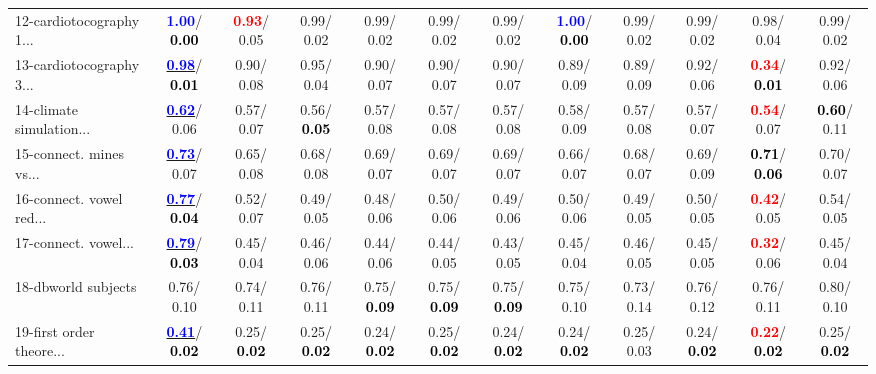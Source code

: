 \begin{table}[h]
\begin{center}
{\begin{tabular}{lc|c|c|c|c|c|c|c|c|c|c}
12-cardiotocography 1... & \textcolor{blue}{\textbf{  1.00}}/\textcolor{black}{\textbf{  0.00}} & \textcolor{red}{\textbf{  0.93}}/  0.05 &   0.99/  0.02 &   0.99/  0.02 &   0.99/  0.02 &   0.99/  0.02 & \textcolor{blue}{\textbf{  1.00}}/\textcolor{black}{\textbf{  0.00}} &   0.99/  0.02 &   0.99/  0.02 &   0.98/  0.04 &   0.99/  0.02 \\
13-cardiotocography 3... & \underline{\textcolor{blue}{\textbf{  0.98}}}/\textcolor{black}{\textbf{  0.01}} &   0.90/  0.08 &   0.95/  0.04 &   0.90/  0.07 &   0.90/  0.07 &   0.90/  0.07 &   0.89/  0.09 &   0.89/  0.09 &   0.92/  0.06 & \textcolor{red}{\textbf{  0.34}}/\textcolor{black}{\textbf{  0.01}} &   0.92/  0.06 \\
14-climate simulation... & \underline{\textcolor{blue}{\textbf{  0.62}}}/  0.06 &   0.57/  0.07 &   0.56/\textcolor{black}{\textbf{  0.05}} &   0.57/  0.08 &   0.57/  0.08 &   0.57/  0.08 &   0.58/  0.09 &   0.57/  0.08 &   0.57/  0.07 & \textcolor{red}{\textbf{  0.54}}/  0.07 & \textcolor{black}{\textbf{  0.60}}/  0.11 \\ \hline
15-connect. mines vs... & \underline{\textcolor{blue}{\textbf{  0.73}}}/  0.07 &   0.65/  0.08 &   0.68/  0.08 &   0.69/  0.07 &   0.69/  0.07 &   0.69/  0.07 &   0.66/  0.07 &   0.68/  0.07 &   0.69/  0.09 & \textcolor{black}{\textbf{  0.71}}/\textcolor{black}{\textbf{  0.06}} &   0.70/  0.07 \\
16-connect. vowel red... & \underline{\textcolor{blue}{\textbf{  0.77}}}/\textcolor{black}{\textbf{  0.04}} &   0.52/  0.07 &   0.49/  0.05 &   0.48/  0.06 &   0.50/  0.06 &   0.49/  0.06 &   0.50/  0.06 &   0.49/  0.05 &   0.50/  0.05 & \textcolor{red}{\textbf{  0.42}}/  0.05 &   0.54/  0.05 \\
17-connect. vowel... & \underline{\textcolor{blue}{\textbf{  0.79}}}/\textcolor{black}{\textbf{  0.03}} &   0.45/  0.04 &   0.46/  0.06 &   0.44/  0.06 &   0.44/  0.05 &   0.43/  0.05 &   0.45/  0.04 &   0.46/  0.05 &   0.45/  0.05 & \textcolor{red}{\textbf{  0.32}}/  0.06 &   0.45/  0.04 \\
18-dbworld subjects &   0.76/  0.10 &   0.74/  0.11 &   0.76/  0.11 &   0.75/\textcolor{black}{\textbf{  0.09}} &   0.75/\textcolor{black}{\textbf{  0.09}} &   0.75/\textcolor{black}{\textbf{  0.09}} &   0.75/  0.10 &   0.73/  0.14 &   0.76/  0.12 &   0.76/  0.11 &   0.80/  0.10 \\
19-first order theore... & \underline{\textcolor{blue}{\textbf{  0.41}}}/\textcolor{black}{\textbf{  0.02}} &   0.25/\textcolor{black}{\textbf{  0.02}} &   0.25/\textcolor{black}{\textbf{  0.02}} &   0.24/\textcolor{black}{\textbf{  0.02}} &   0.25/\textcolor{black}{\textbf{  0.02}} &   0.24/\textcolor{black}{\textbf{  0.02}} &   0.24/\textcolor{black}{\textbf{  0.02}} &   0.25/  0.03 &   0.24/\textcolor{black}{\textbf{  0.02}} & \textcolor{red}{\textbf{  0.22}}/\textcolor{black}{\textbf{  0.02}} &   0.25/\textcolor{black}{\textbf{  0.02}} \\

\end{tabular}}
\end{center}
\end{table}

